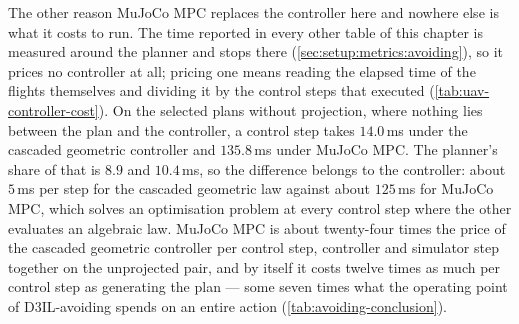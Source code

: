 The other reason MuJoCo MPC replaces the controller here and nowhere else is what it costs to run. The
time reported in every other table of this chapter is measured around the planner and stops there
(\autoref{sec:setup:metrics:avoiding}), so it prices no controller at all; pricing one means reading the
elapsed time of the flights themselves and dividing it by the control steps that executed
(\autoref{tab:uav-controller-cost}). On the selected plans without projection, where nothing lies between
the plan and the controller, a control step takes $14.0$\,ms under the cascaded geometric controller and
$135.8$\,ms under MuJoCo MPC. The planner's share of that is $8.9$ and $10.4$\,ms, so the difference belongs to
the controller: about $5$\,ms per step for the cascaded geometric law against about $125$\,ms for MuJoCo MPC,
which solves an optimisation problem at every control step where the other evaluates an algebraic law. MuJoCo
MPC is about twenty-four times the price of the cascaded geometric controller per control step, controller
and simulator step together on the unprojected pair, and by itself it costs twelve times as much per control
step as generating the plan --- some seven times what the operating
point of D3IL-avoiding spends on an entire action (\autoref{tab:avoiding-conclusion}).

